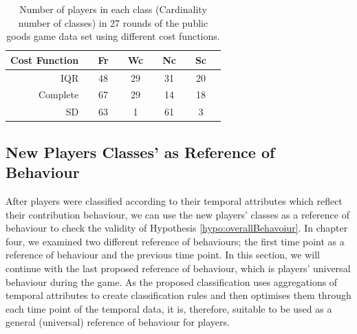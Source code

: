 \begin{table}[!h]
    \small
    \centering
    \caption{Number of players in each class (Cardinality number of classes) in 27 rounds of the public goods game data set using different cost functions.}
    \label{tab:NumberOfClassMembershippGG27}
    \begin{tabular}{@{}rccccccccc@{}}
        \toprule
        Cost Function & \phantom{abc}  & Fr & \phantom{a} & Wc & \phantom{a} & Nc & \phantom{a} & Sc & \phantom{a} \\
        \midrule

        IQR           & \phantom{abc} & 48 & \phantom{a} & 29 & \phantom{a} & 31 & \phantom{a} & 20 & \phantom{a}\\

        Complete      & \phantom{abc} & 67 & \phantom{a} & 29 & \phantom{a} & 14 & \phantom{a} & 18 & \phantom{a}\\
    
        SD            & \phantom{abc} & 63 & \phantom{a} & 1 & \phantom{a} & 61 & \phantom{a} & 3 & \phantom{a}\\

        \bottomrule
    \end{tabular}
\end{table}

\subsection{New Players Classes' as Reference of Behaviour}

After players were classified according to their temporal attributes which reflect their contribution behaviour, we can use the new players' classes as a reference of behaviour to check the validity of Hypothesis \ref{hypo:overallBehavoiur}. In chapter four, we examined two different reference of behaviours; the first time point as a reference of behaviour and the previous time point. In this section, we will continue with the last proposed reference of behaviour, which is players' universal behaviour during the game. As the proposed classification uses aggregations of temporal attributes to create classification rules and then optimises them through each time point of the temporal data,  it is, therefore,  suitable to be used as a general (universal) reference of behaviour for players.


